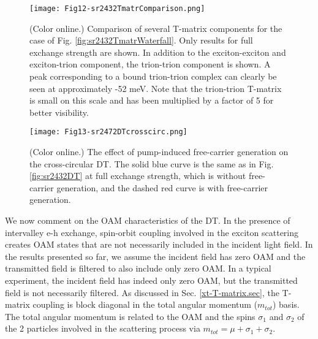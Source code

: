 \documentclass[aps,prb,superscriptaddress,letterpaper,amsmath,amssymb,twocolumn,preprintnumbers]{revtex4}
\begin{document}
\begin{figure}
	\centering
	\texttt{[image: Fig12-sr2432TmatrComparison.png]}
	\caption{
		(Color online.)
		Comparison of several T-matrix components for the case of Fig. \protect\ref{fig:sr2432TmatrWaterfall}. Only results for full exchange strength
are shown.   In addition to the exciton-exciton and exciton-trion component, the trion-trion component is shown. A peak corresponding to a bound trion-trion complex can clearly be seen at approximately -52 meV. Note that the trion-trion T-matrix is small on this scale and has been multiplied by a factor of 5 for better visibility.
 }	
	\label{fig:sr2464TmatComparison}
\end{figure}







\begin{figure}
	\centering
	\texttt{[image: Fig13-sr2472DTcrosscirc.png]}
	\caption{
		(Color online.)
		The effect of pump-induced free-carrier generation on the cross-circular DT.  The solid blue curve is the same as in
Fig. \protect\ref{fig:sr2432DT} at full exchange strength, which is  without free-carrier generation,
  and the dashed red curve is with free-carrier generation.
 }	
	\label{fig:sr2472DT}
\end{figure}


We now comment on the OAM characteristics of the DT. In the presence of intervalley e-h exchange, spin-orbit coupling involved in the exciton scattering
creates OAM states that are not necessarily included in the incident light field. In the results presented so far, we  assume the incident field has zero OAM and the transmitted field is filtered to also include only zero OAM. In a typical experiment, the incident field has indeed only zero OAM, but the transmitted field is not necessarily filtered.
As discussed in Sec. \ref{xt-T-matrix.sec},
 the T-matrix coupling is block diagonal in the total angular momentum ($m_{tot}$) basis.
The total angular momentum is related to the OAM and the spins $\sigma_1$ and  $\sigma_2$ of the 2 particles involved in the scattering process
via
$m_{tot} = \mu + \sigma_1 + \sigma_2$.
\end{document}
